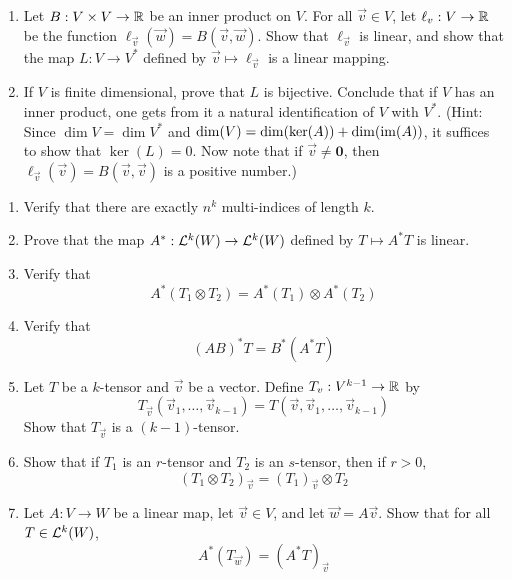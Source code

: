 \documentclass[../psets.tex]{subfiles}
\begin{document}
\begin{enumerate}[label={\textbf{1.2.\roman*.}}]
    \begin{enumerate}
        \item Let $B:V\times V\to\R$ be an inner product on $V$. For all $\vec{v}\in V$, let $\ell_\vec{v}:V\to\R$ be the function $\ell_\vec{v}(\vec{w})=B(\vec{v},\vec{w})$. Show that $\ell_\vec{v}$ is linear, and show that the map $L:V\to V^*$ defined by $\vec{v}\mapsto\ell_\vec{v}$ is a linear mapping.
        \item If $V$ is finite dimensional, prove that $L$ is bijective. Conclude that if $V$ has an inner product, one gets from it a natural identification of $V$ with $V^*$. (Hint: Since $\dim V=\dim V^*$ and $\dim(V)=\dim(\ker(A))+\dim(\im(A))$, it suffices to show that $\ker(L)=0$. Now note that if $\vec{v}\neq\bm{0}$, then $\ell_\vec{v}(\vec{v})=B(\vec{v},\vec{v})$ is a positive number.)
    \end{enumerate}
\end{enumerate}
\begin{enumerate}[label={\textbf{1.3.\roman*.}}]
    \item Verify that there are exactly $n^k$ multi-indices of length $k$.
    \item Prove that the map $A^*:\lin[k]{W}\to\lin[k]{W}$ defined by $T\mapsto A^*T$ is linear.
    \item Verify that
    \begin{equation*}
        A^*(T_1\otimes T_2) = A^*(T_1)\otimes A^*(T_2)
    \end{equation*}
    \item Verify that
    \begin{equation*}
        (AB)^*T = B^*(A^*T)
    \end{equation*}
    \setcounter{enumi}{6}
    \item Let $T$ be a $k$-tensor and $\vec{v}$ be a vector. Define $T_\vec{v}:V^{k-1}\to\R$ by
    \begin{equation*}
        T_\vec{v}(\vec{v}_1,\dots,\vec{v}_{k-1}) = T(\vec{v},\vec{v}_1,\dots,\vec{v}_{k-1})
    \end{equation*}
    Show that $T_\vec{v}$ is a $(k-1)$-tensor.
    \item Show that if $T_1$ is an $r$-tensor and $T_2$ is an $s$-tensor, then if $r>0$,
    \begin{equation*}
        (T_1\otimes T_2)_\vec{v} = (T_1)_\vec{v}\otimes T_2
    \end{equation*}
    \item Let $A:V\to W$ be a linear map, let $\vec{v}\in V$, and let $\vec{w}=A\vec{v}$. Show that for all $T\in\lin[k]{W}$,
    \begin{equation*}
        A^*(T_\vec{w}) = (A^*T)_\vec{v}
    \end{equation*}
\end{enumerate}
\end{document}
